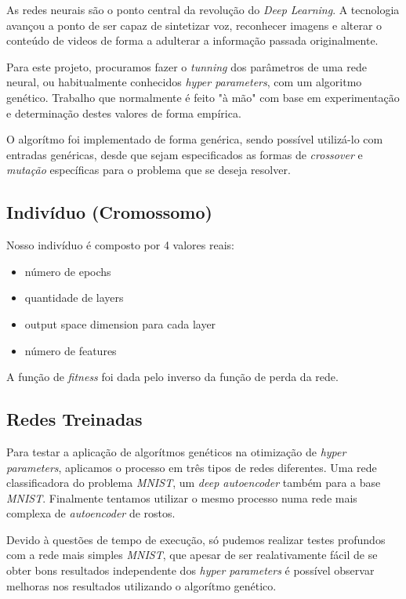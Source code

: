 \documentclass[twoside,conference,a4paper]{IEEEtran}
\begin{document}
As redes neurais são o ponto central da revolução do \emph{Deep Learning}. A tecnologia avançou a ponto de ser capaz de sintetizar voz, reconhecer imagens e alterar o conteúdo de videos de forma a adulterar a informação passada originalmente.

Para este projeto, procuramos fazer o \emph{tunning} dos parâmetros de uma rede neural, ou habitualmente conhecidos \emph{hyper parameters}, com um algoritmo genético. Trabalho que normalmente é feito "à mão" com base em experimentação e determinação destes valores de forma empírica.

O algorítmo foi implementado de forma genérica, sendo possível utilizá-lo com entradas genéricas, desde que sejam especificados as formas de \emph{crossover} e \emph{mutação} específicas para o problema que se deseja resolver.



\subsection{Indivíduo (Cromossomo)}

Nosso indivíduo é composto por 4 valores reais:

\begin{itemize}
    \item número de epochs
    \item quantidade de layers
    \item output space dimension para cada layer
    \item número de features
\end{itemize}

A função de \emph{fitness} foi dada pelo inverso da função de perda da rede.

\subsection{Redes Treinadas}
Para testar a aplicação de algorítmos genéticos na otimização de \emph{hyper parameters}, aplicamos o processo em três tipos de redes diferentes. Uma rede classificadora do problema \emph{MNIST}, um \emph{deep autoencoder} também para a base \emph{MNIST}. Finalmente tentamos utilizar o mesmo processo numa rede mais complexa de \emph{autoencoder} de rostos.

Devido à questões de tempo de execução, só pudemos realizar testes profundos com a rede mais simples \emph{MNIST}, que apesar de ser realativamente fácil de se obter bons resultados independente dos \emph{hyper parameters} é possível observar melhoras nos resultados utilizando o algorítmo genético.
\end{document}
